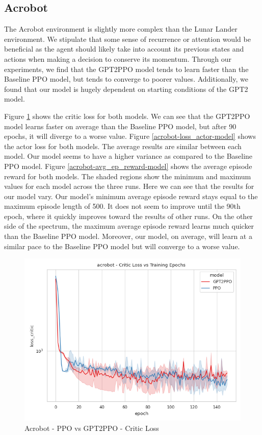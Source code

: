 \subsection{Acrobot}
The Acrobot environment is slightly more complex than the Lunar Lander environment. We stipulate that
some sense of recurrence or attention would be beneficial as the agent should likely take into account its previous
states and actions when making a decision to conserve its momentum.
Through our experiments, we find that the GPT2PPO model tends to learn faster than the Baseline PPO model, but tends to converge to
poorer values. Additionally, we found that our model is hugely dependent on starting conditions of the GPT2 model.

Figure \ref{acrobot-loss_critic-model} shows the critic loss for both models.
We can see that the GPT2PPO model learns faster on average than the Baseline PPO model, but after 90 epochs, it will diverge to a worse value.
Figure \ref{acrobot-loss_actor-model} shows the actor loss for both models. The average results are similar between each model. Our model seems
to have a higher variance as compared to the Baseline PPO model.
Figure \ref{acrobot-avg_ep_reward-model} shows the average episode reward for both models. The shaded regions show the minimum and maximum
values for each model across the three runs. Here we can see that the results for our model vary. Our model's minimum average episode reward
stays equal to the maximum episode length of 500. It does not seem to improve until the 90th epoch, where it quickly improves toward the results of
other runs. On the other side of the spectrum, the maximum average episode reward learns much quicker than the Baseline PPO model. Moreover, our model,
on average, will learn at a similar pace to the Baseline PPO model but will converge to a worse value.

\begin{figure}[htbp]
    \centerline{\includegraphics[width=\columnwidth]{./img/acrobot-loss_critic-model.png}}
    \caption{Acrobot - PPO vs GPT2PPO - Critic Loss}
    \label{acrobot-loss_critic-model}
\end{figure}

